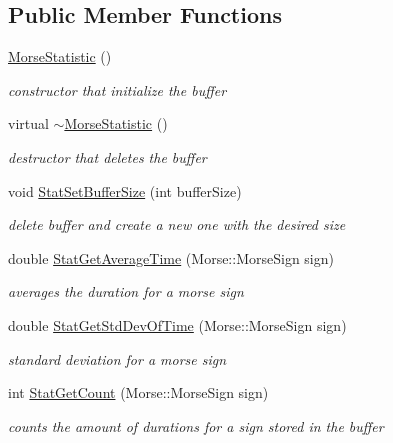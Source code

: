 \subsection*{Public Member Functions}
\begin{DoxyCompactItemize}
\item 
\hyperlink{classMorseStatistic_a48a3dc7e8f56e32caa91689593b07cff}{Morse\+Statistic} ()
\begin{DoxyCompactList}\small\item\em constructor that initialize the buffer \end{DoxyCompactList}\item 
virtual \hyperlink{classMorseStatistic_a9eb933dcacfbc2e124208f901faba46d}{$\sim$\+Morse\+Statistic} ()
\begin{DoxyCompactList}\small\item\em destructor that deletes the buffer \end{DoxyCompactList}\item 
void \hyperlink{classMorseStatistic_ae5f4ab08849cd2cb724748108309661e}{Stat\+Set\+Buffer\+Size} (int buffer\+Size)
\begin{DoxyCompactList}\small\item\em delete buffer and create a new one with the desired size \end{DoxyCompactList}\item 
double \hyperlink{classMorseStatistic_a3347edf33028378ec2009a67c7f5b14d}{Stat\+Get\+Average\+Time} (Morse\+::\+Morse\+Sign sign)
\begin{DoxyCompactList}\small\item\em averages the duration for a morse sign \end{DoxyCompactList}\item 
double \hyperlink{classMorseStatistic_af92781be60bdd00871dcb5907939dcb6}{Stat\+Get\+Std\+Dev\+Of\+Time} (Morse\+::\+Morse\+Sign sign)
\begin{DoxyCompactList}\small\item\em standard deviation for a morse sign \end{DoxyCompactList}\item 
int \hyperlink{classMorseStatistic_a541c0f03283b2327051bb30e2241753a}{Stat\+Get\+Count} (Morse\+::\+Morse\+Sign sign)
\begin{DoxyCompactList}\small\item\em counts the amount of durations for a sign stored in the buffer \end{DoxyCompactList}\item 

\end{DoxyCompactItemize}
